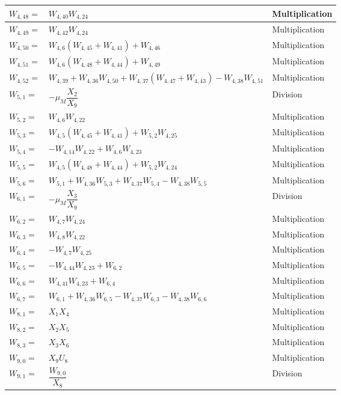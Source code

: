 {\begin{longtable}{|p{1.5cm}|l|p{2cm}|}
$W_{4,48}=$ & $ W_{4,40}W_{4,24} $ & Multiplication \\ \hline
$W_{4,49}=$ & $ W_{4,42}W_{4,24} $ & Multiplication \\ \hline
$W_{4,50}=$ & $ W_{4,6}\left(W_{4,45}+W_{4,41} \right) + W_{4,46} $ & Multiplication \\ \hline
$W_{4,51}=$ & $ W_{4,6}\left(W_{4,48}+W_{4,44} \right) + W_{4,49} $ & Multiplication \\ \hline
$W_{4,52}=$ & $ W_{4,39} +W_{4,36}W_{4,50}+W_{4,37}\left(W_{4,47}+W_{4,43}\right)-W_{4,38}W_{4,51} $ & Multiplication \\ \hline
$W_{5,1}=$ & $-\mu_{M}\dfrac{X_{2}}{X_{9}}  $ & Division \\ \hline
$W_{5,2}=$ & $ W_{4,6}W_{4,22} $ & Multiplication \\ \hline
$W_{5,3}=$ & $ W_{4,5} \left(W_{4,45}+W_{4,41}\right) +W_{5,2} W_{4,25} $ & Multiplication \\ \hline
$W_{5,4}=$ & $ -W_{4,14}W_{4,22}+W_{4,6}W_{4,23} $ & Multiplication \\ \hline
$W_{5,5}=$ & $ W_{4,5} \left(W_{4,48}+W_{4,44}\right)+W_{5,2}W_{4,24} $ & Multiplication \\ \hline
$W_{5,6}=$ & $ W_{5,1} + W_{4,36}W_{5,3}+W_{4,37}W_{5,4}-W_{4,38}W_{5,5} $ & Multiplication \\ \hline
$W_{6,1}=$ & $ -\mu_{M}\dfrac{X_{3}}{X_{9}} $ & Division \\ \hline
$W_{6,2}=$ & $ W_{4,7}W_{4,24} $ & Multiplication \\ \hline
$W_{6,3}=$ & $ W_{4,8}W_{4,22} $ & Multiplication \\ \hline
$W_{6,4}=$ & $ -W_{4,7}W_{4,25} $ & Multiplication \\ \hline
$W_{6,5}=$ & $ -W_{4,44}W_{4,23}+W_{6,2} $ & Multiplication \\ \hline
$W_{6,6}=$ & $ W_{4,41}W_{4,23}+W_{6,4} $ & Multiplication \\ \hline
$W_{6,7}=$ & $ W_{6,1} + W_{4,36}W_{6,5}-W_{4,37}W_{6,3}-W_{4,38}W_{6,6} $ & Multiplication \\ \hline
$W_{8,1}=$ & $ X_{1}X_{4} $ & Multiplication \\ \hline
$W_{8,2}=$ & $ X_{2}X_{5} $ & Multiplication \\ \hline
$W_{8,3}=$ & $ X_{3}X_{6} $ & Multiplication \\ \hline
$W_{9,0}=$ & $ X_{9}U_{8} $ & Multiplication \\ \hline
$W_{9,1}=$ & $ \dfrac{W_{9,0}}{X_{8}} $ & Division \\ \hline

\end{longtable}}

